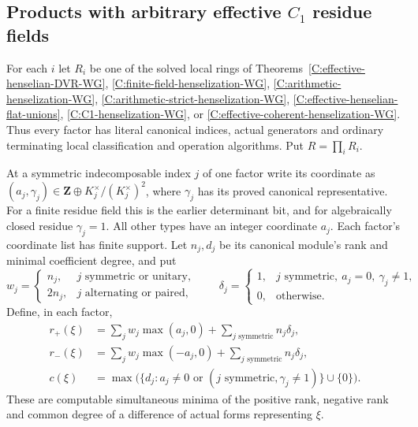 \subsection[Products with arbitrary effective C1 residue fields]{Products with arbitrary effective $C_1$ residue fields}
\label{C:C1-coherent-products-subsection}

\begin{theorem}
\label{C:C1-coherent-products-WG}
For each $i$ let $R_i$ be one of the solved local
rings of Theorems~\ref{C:effective-henselian-DVR-WG},
\ref{C:finite-field-henselization-WG},
\ref{C:arithmetic-henselization-WG},
\ref{C:arithmetic-strict-henselization-WG},
\ref{C:effective-henselian-flat-unions},
\ref{C:C1-henselization-WG}, or
\ref{C:effective-coherent-henselization-WG}.
Thus every factor has literal canonical indices,
actual generators and ordinary terminating local
classification and operation algorithms.
Put $R=\prod_iR_i$.

At a symmetric indecomposable index $j$ of
one factor write its coordinate as
$(a_j,\gamma_j)\in
\mathbf Z\oplus K_j^\times/(K_j^\times)^2$,
where $\gamma_j$ has its proved canonical
representative.  For a finite residue field
this is the earlier determinant bit, and
for algebraically closed residue
$\gamma_j=1$.
All other types have an integer coordinate
$a_j$.  Each factor's coordinate list has
finite support.
Let $n_j,d_j$ be its canonical module's
rank and minimal coefficient degree, and put
\[
 w_j=\begin{cases}
 n_j,&j\text{ symmetric or unitary},\\
 2n_j,&j\text{ alternating or paired},
 \end{cases}
 \qquad
 \delta_j=\begin{cases}
 1,&j\text{ symmetric},\ a_j=0,\ \gamma_j\ne1,\\
 0,&\text{otherwise}.
 \end{cases}                                             \tag{C.3.CP1}
\]
Define, in each factor,
\[
 \begin{split}
 r_+(\xi)&=\sum_jw_j\max(a_j,0)
                +\sum_{j\text{ symmetric}}n_j\delta_j,\\
 r_-(\xi)&=\sum_jw_j\max(-a_j,0)
                +\sum_{j\text{ symmetric}}n_j\delta_j,\\
 c(\xi)&=\max\bigl(\{d_j:a_j\ne0\text{ or }
                   (j\text{ symmetric},\gamma_j\ne1)\}\cup\{0\}\bigr).
 \end{split}                                             \tag{C.3.CP2}
\]
These are computable simultaneous minima of the
positive rank, negative rank and common degree
of a difference of actual forms representing
$\xi$.


\end{theorem}

